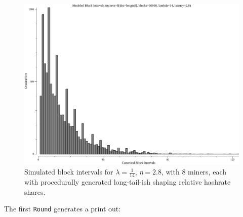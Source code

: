 \documentclass[11pt]{article}
\theoremstyle{plain}
\begin{document}
\begin{figure}[tph]
    \centering
\includegraphics[width=1.0\textwidth]{go-poisson_A0_blockIntervals.png}
    \caption{
      Simulated block intervals for $\lambda=\frac{1}{14}$, $\eta=2.8$, with
      $8$ miners, each with procedurally generated long-tail-ish shaping
      relative hashrate shares.
    }
\end{figure}

\pagebreak

The first \texttt{Round} generates a print out:
\end{document}
